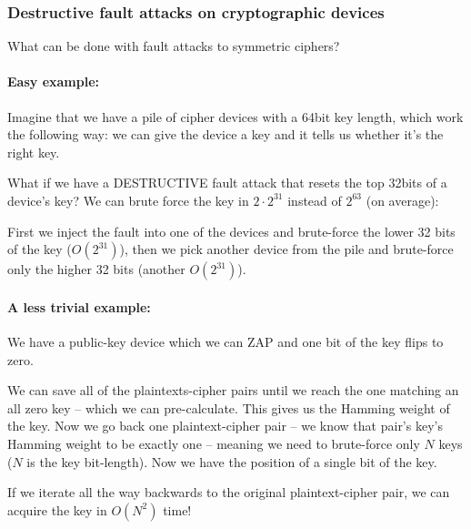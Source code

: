 \subsubsection*{Destructive fault attacks on cryptographic devices}\label{subsubsec:destructive_fault_attacks_on_cryptographic_devices}
What can be done with fault attacks to symmetric ciphers? \paragraph{Easy
example:} Imagine that we have a pile of cipher devices with a 64bit key length,
which work the following way: we can give the device a key and it tells us
whether it's the right key.

What if we have a DESTRUCTIVE fault attack that resets the top 32bits of a
device's key? We can brute force the key in \(2\cdot 2^{31}\) instead of
\(2^{63}\) (on average):

First we inject the fault into one of the devices and brute-force the lower 32
bits of the key (\(O(2^{31})\)), then we pick another device from the pile and
brute-force only the higher 32 bits (another \(O(2^{31})\)).

\paragraph{A less trivial example:} We have a public-key device which we can ZAP
and one bit of the key flips to zero.

We can save all of the plaintexts-cipher pairs until we reach the one matching
an all zero key -- which we can pre-calculate. This gives us the Hamming weight
of the key. Now we go back one plaintext-cipher pair -- we know that pair's
key's Hamming weight to be exactly one -- meaning we need to brute-force only
\(N\) keys (\(N\) is the key bit-length). Now we have the position of a single
bit of the key.

If we iterate all the way backwards to the original plaintext-cipher pair, we
can acquire the key in \(O(N^2)\) time!

